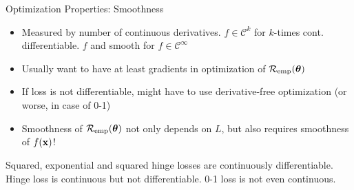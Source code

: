 \documentclass[11pt,compress,t,notes=noshow, xcolor=table]{beamer}
\begin{document}

\begin{frame}{Optimization Properties: Smoothness}


\begin{itemize}
\item Measured by number of continuous derivatives. $f \in \mathcal{C}^k$ for $k$-times cont. differentiable. $f$ and smooth for $f \in \mathcal{C}^{\infty}$
\item Usually want to have at least gradients in optimization of $\mathcal{R}_{\text{emp}}(\bm{\theta})$
\item If loss is not differentiable, might have to use derivative-free optimization (or worse, in case of 0-1)
\item Smoothness of $\mathcal{R}_{\text{emp}}(\bm{\theta})$ not only depends on $L$, but also requires smoothness of $f(\mathbf{x})$! 
\end{itemize}

\vfill

%
{
\raggedright {\footnotesize
Squared, exponential and squared hinge losses are continuously 
differentiable. Hinge loss is continuous but not differentiable. 
0-1 loss is not even continuous.}
}%





\end{frame}
\end{document}

